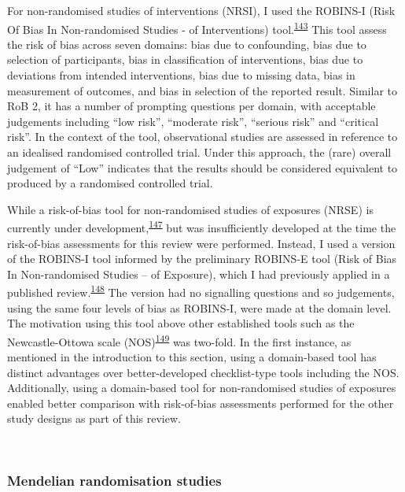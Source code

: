 \documentclass[a4paper, twoside]{templates/ociamthesis}
\begin{document}
For non-randomised studies of interventions (NRSI), I used the ROBINS-I (Risk Of Bias In Non-randomised Studies - of Interventions) tool.\textsuperscript{\protect\hyperlink{ref-sterne2016}{143}} This tool assess the risk of bias across seven domains: bias due to confounding, bias due to selection of participants, bias in classification of interventions, bias due to deviations from intended interventions, bias due to missing data, bias in measurement of outcomes, and bias in selection of the reported result. Similar to RoB 2, it has a number of prompting questions per domain, with acceptable judgements including ``low risk'', ``moderate risk'', ``serious risk'' and ``critical risk''. In the context of the tool, observational studies are assessed in reference to an idealised randomised controlled trial. Under this approach, the (rare) overall judgement of ``Low'' indicates that the results should be considered equivalent to produced by a randomised controlled trial.

While a risk-of-bias tool for non-randomised studies of exposures (NRSE) is currently under development,\textsuperscript{\protect\hyperlink{ref-morganr2020}{147}} but was insufficiently developed at the time the risk-of-bias assessments for this review were performed. Instead, I used a version of the ROBINS-I tool informed by the preliminary ROBINS-E tool (Risk of Bias In Non-randomised Studies -- of Exposure), which I had previously applied in a published review.\textsuperscript{\protect\hyperlink{ref-french2019}{148}} The version had no signalling questions and so judgements, using the same four levels of bias as ROBINS-I, were made at the domain level. The motivation using this tool above other established tools such as the Newcastle-Ottowa scale (NOS)\textsuperscript{\protect\hyperlink{ref-wells2000}{149}} was two-fold. In the first instance, as mentioned in the introduction to this section, using a domain-based tool has distinct advantages over better-developed checklist-type tools including the NOS. Additionally, using a domain-based tool for non-randomised studies of exposures enabled better comparison with risk-of-bias assessments performed for the other study designs as part of this review.

~

\hypertarget{mendelian-randomisation-studies}{%
\subsubsection{Mendelian randomisation studies}\label{mendelian-randomisation-studies}}
\end{document}
